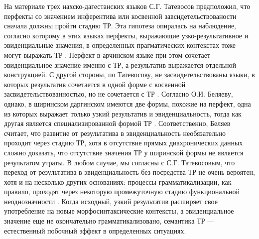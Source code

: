 На материале трех нахско-дагестанских языков С.Г. Татевосов предположил, что перфекты со значением инферентива или косвенной завсидетельствованости сначала должны пройти стадию ТР. Эта гипотеза опиралась на наблюдение, согласно которому в этих языках перфекты, выражающие узко-результативное и эвиденциальные значения, в определенных прагматических контекстах тоже могут выражать ТР \citep[460--462]{tatevosov2001}. Перфект в арчинском языке при этом сочетает эвиденциальное значение именно с ТР, а результатив выражается отдельной конструкцией. С другой стороны, по Татевосову, не засвидетельствованы языки, в которых результатив сочетается в одной форме с косвенной засвидетельствованностью, но не сочетается с ТР \citep[460--462]{tatevosov2001}. Согласно О.И. Беляеву, однако, в ширинском даргинском имеются две формы, похожие на перфект, одна из которых выражает только узкий результатив и эвиденциальность, тогда как другая является специализированной формой  ТР \citep{belyaev2018}. %
Соответственно, Беляев считает, что развитие от результатива в эвиденциальность необязательно проходит через стадию ТР, хотя в отсутствие прямых диахронических данных сложно доказать, что отсутствие значения ТР у ширинской формы не является результатом утраты. В любом случае, мы согласны с С.Г. Татевосовым, что переход от результатива в эвиденциальность без посредства ТР не очень вероятен, хотя и на несколько других основаниях: процессы грамматикализации, как правило, проходят через некоторую промежуточную стадию функциональной неоднозначности \citep{diewald2006}. Когда исходный, узкий результатив расширяет свое употребление на новые морфосинтаксические контексты, а эвиденциальное значение еще не окончательно грамматикализовано, семантика ТР --- естественный побочный эффект в определенных ситуациях. \color{purple}
